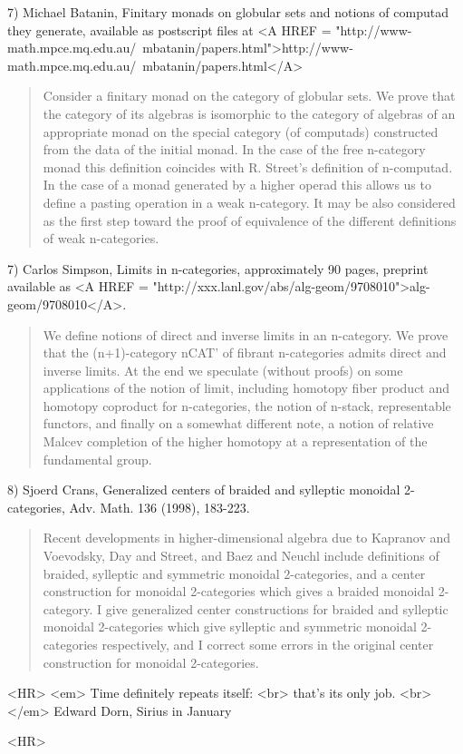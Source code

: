 7) Michael Batanin, Finitary monads on globular sets and notions of
computad they generate, available as postscript files at
<A HREF = "http://www-math.mpce.mq.edu.au/~mbatanin/papers.html">http://www-math.mpce.mq.edu.au/~mbatanin/papers.html</A>

\begin{quote}
Consider a finitary monad on the category of globular sets. We prove
that the category of its algebras is isomorphic to the category of
algebras of an appropriate monad on the special category (of
computads) constructed from the data of the initial monad. In the case
of the free n-category monad this definition coincides with R.
Street's definition of n-computad. In the case of a monad generated
by a higher operad this allows us to define a pasting operation in a
weak n-category. It may be also considered as the first step toward
the proof of equivalence of the different definitions of weak
n-categories.
\end{quote}
    

7) Carlos Simpson, Limits in n-categories, approximately 90 pages,
preprint available as 
<A HREF =
"http://xxx.lanl.gov/abs/alg-geom/9708010">alg-geom/9708010</A>.
\begin{quote}
We define notions of direct and inverse limits in an n-category.  We
prove that the (n+1)-category nCAT' of fibrant n-categories admits
direct and inverse limits. At the end we speculate (without proofs) on
some applications of the notion of limit, including homotopy fiber
product and homotopy coproduct for n-categories, the notion of
n-stack, representable functors, and finally on a somewhat different
note, a notion of relative Malcev completion of the higher homotopy at
a representation of the fundamental group.
\end{quote}
    

8) Sjoerd Crans, Generalized centers of braided and sylleptic
monoidal 2-categories, Adv. Math. 136 (1998), 183-223.

\begin{quote}
Recent developments in higher-dimensional algebra due to Kapranov and
Voevodsky, Day and Street, and Baez and Neuchl include definitions of
braided, sylleptic and symmetric monoidal 2-categories, and a center
construction for monoidal 2-categories which gives a braided monoidal
2-category. I give generalized center constructions for braided and
sylleptic monoidal 2-categories which give sylleptic and symmetric
monoidal 2-categories respectively, and I correct some errors in the
original center construction for monoidal 2-categories.
\end{quote}
    











 <HR>
<em> Time definitely repeats itself: <br>
 that's its only job. <br></em>
 Edward Dorn, Sirius in January


<HR>




